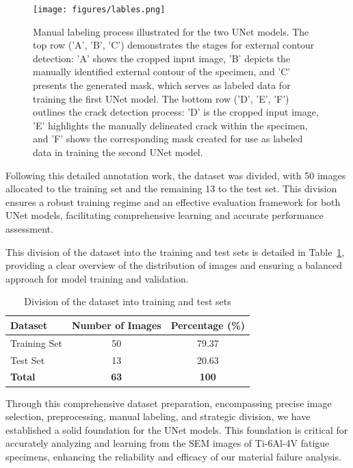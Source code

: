 \documentclass[preprint,12pt]{elsarticle}
\begin{document}
\begin{figure}[h!]
  \centering
  \texttt{[image: figures/lables.png]}
  \caption{Manual labeling process illustrated for the two UNet models. The top row ('A', 'B', 'C') demonstrates the stages for external contour detection: 'A' shows the cropped input image, 'B' depicts the manually identified external contour of the specimen, and 'C' presents the generated mask, which serves as labeled data for training the first UNet model. The bottom row ('D', 'E', 'F') outlines the crack detection process: 'D' is the cropped input image, 'E' highlights the manually delineated crack within the specimen, and 'F' shows the corresponding mask created for use as labeled data in training the second UNet model.}
  \label{lables}
\end{figure}

Following this detailed annotation work, the dataset was divided, with 50 images allocated to the training set and the remaining 13 to the test set. This division ensures a robust training regime and an effective evaluation framework for both UNet models, facilitating comprehensive learning and accurate performance assessment.

This division of the dataset into the training and test sets is detailed in Table~\ref{tab:dataset_division}, providing a clear overview of the distribution of images and ensuring a balanced approach for model training and validation.

\begin{table}[htbp]
\centering
\small
\caption{Division of the dataset into training and test sets}
\label{tab:dataset_division}
\begin{tabular}{@{}lcc@{}}
\toprule
\textbf{Dataset} & \textbf{Number of Images} & \textbf{Percentage (\%)} \\ \midrule
Training Set & 50 & 79.37 \\
Test Set & 13 & 20.63 \\ \bottomrule
\textbf{Total} & \textbf{63} & \textbf{100} \\ \bottomrule
\end{tabular}
\end{table}

Through this comprehensive dataset preparation, encompassing precise image selection, preprocessing, manual labeling, and strategic division, we have established a solid foundation for the UNet models. This foundation is critical for accurately analyzing and learning from the SEM images of Ti-6Al-4V fatigue specimens, enhancing the reliability and efficacy of our material failure analysis.
\end{document}
